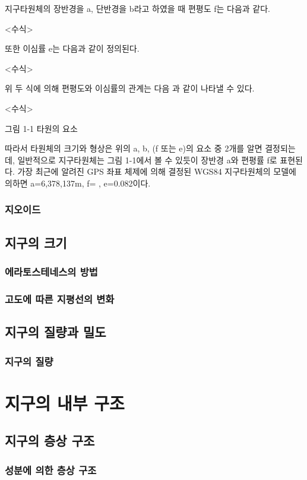 지구타원체의 장반경을 a, 단반경을 b라고 하였을 때 편평도 f는 다음과 같다.

<수식>


또한 이심률 e는 다음과 같이 정의된다.

<수식>


위 두 식에 의해 편평도와 이심률의 관계는 다음 과 같이 나타낼 수 있다.

<수식>

그림 1-1 타원의 요소


따라서 타원체의 크기와 형상은 위의 a, b, (f 또는 e)의 요소 중 2개를 알면 결정되는데, 일반적으로 지구타원체는 그림 1-1에서 볼 수 있듯이 장반경 a와 편평률 f로 표현된다.
가장 최근에 알려진 GPS 좌표 체제에 의해 결정된 WGS84 지구타원체의 모델에 의하면 a=6,378,137m, f= , e=0.082이다.

\subsubsection{지오이드}


\subsection{지구의 크기}\index{}
\subsubsection{에라토스테네스의 방법}\index{}
\subsubsection{고도에 따른 지평선의 변화}\index{}

\subsection{지구의 질량과 밀도}\index{}
\subsubsection{지구의 질량}\index{}


\section{지구의 내부 구조}\index{}
\subsection{지구의 층상 구조}\index{}
\subsubsection{성분에 의한 층상 구조}\index{}
